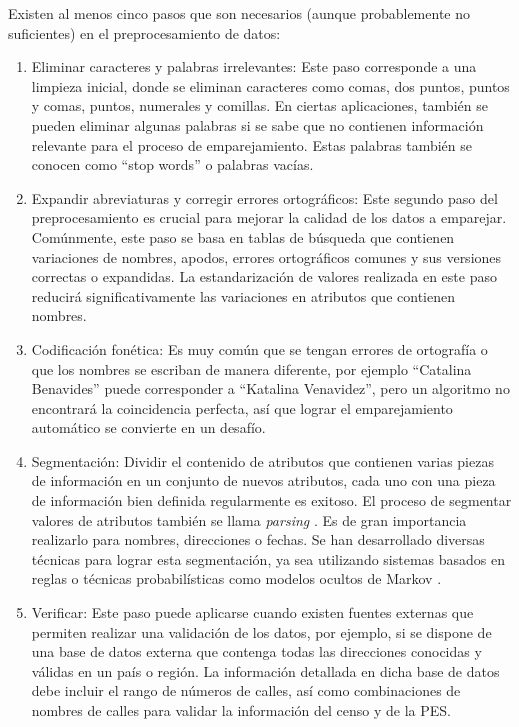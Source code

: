 \documentclass[
  12pt,
]{book}
\begin{document}
Existen al menos cinco pasos que son necesarios (aunque probablemente no suficientes) en el preprocesamiento de datos:

\begin{enumerate}
\def\labelenumi{\arabic{enumi}.}
\item
  Eliminar caracteres y palabras irrelevantes: Este paso corresponde a una limpieza inicial, donde se eliminan caracteres como comas, dos puntos, puntos y comas, puntos, numerales y comillas. En ciertas aplicaciones, también se pueden eliminar algunas palabras si se sabe que no contienen información relevante para el proceso de emparejamiento. Estas palabras también se conocen como ``stop words'' o palabras vacías.
\item
  Expandir abreviaturas y corregir errores ortográficos: Este segundo paso del preprocesamiento es crucial para mejorar la calidad de los datos a emparejar. Comúnmente, este paso se basa en tablas de búsqueda que contienen variaciones de nombres, apodos, errores ortográficos comunes y sus versiones correctas o expandidas. La estandarización de valores realizada en este paso reducirá significativamente las variaciones en atributos que contienen nombres.
\item
  Codificación fonética: Es muy común que se tengan errores de ortografía o que los nombres se escriban de manera diferente, por ejemplo ``Catalina Benavides'' puede corresponder a ``Katalina Venavidez'', pero un algoritmo no encontrará la coincidencia perfecta, así que lograr el emparejamiento automático se convierte en un desafío.
\item
  Segmentación: Dividir el contenido de atributos que contienen varias piezas de información en un conjunto de nuevos atributos, cada uno con una pieza de información bien definida regularmente es exitoso. El proceso de segmentar valores de atributos también se llama \emph{parsing} \citep{herzog2007data}. Es de gran importancia realizarlo para nombres, direcciones o fechas. Se han desarrollado diversas técnicas para lograr esta segmentación, ya sea utilizando sistemas basados en reglas o técnicas probabilísticas como modelos ocultos de Markov \citep{churches2002preparation}.
\item
  Verificar: Este paso puede aplicarse cuando existen fuentes externas que permiten realizar una validación de los datos, por ejemplo, si se dispone de una base de datos externa que contenga todas las direcciones conocidas y válidas en un país o región. La información detallada en dicha base de datos debe incluir el rango de números de calles, así como combinaciones de nombres de calles para validar la información del censo y de la PES.
\end{enumerate}
\end{document}
